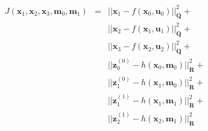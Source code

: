 \documentclass[a4paper,10pt]{article}
\begin{document}
\newline
\newline
\begin{eqnarray}
   J(\textbf{x}_1, \textbf{x}_2, \textbf{x}_3, \textbf{m}_0, \textbf{m}_1) & = & ||\textbf{x}_{1} - f(\textbf{x}_0, \textbf{u}_0)||^2_{\textbf{Q}} +\nonumber \\
                                                                   {} &  & ||\textbf{x}_{2}-f(\textbf{x}_1, \textbf{u}_1) ||^2_{\textbf{Q}} +\nonumber \\
                                                                   {} &  & ||\textbf{x}_{3}-f(\textbf{x}_2, \textbf{u}_2) ||^2_{\textbf{Q}} +\nonumber \\
                                                                   {} &  & || \textbf{z}_0^{(0)} - h(\textbf{x}_0, \textbf{m}_0) ||^2_{\textbf{R}} +\nonumber \\
                                                                   {} &  & || \textbf{z}_1^{(0)} - h(\textbf{x}_1, \textbf{m}_0) ||^2_{\textbf{R}} +\nonumber \\
                                                                   {} &  & || \textbf{z}_1^{(1)} - h(\textbf{x}_1, \textbf{m}_1) ||^2_{\textbf{R}} +\nonumber \\
                                                                   {} &  & || \textbf{z}_2^{(1)} - h(\textbf{x}_2, \textbf{m}_1) ||^2_{\textbf{R}} \nonumber                                                                 
\end{eqnarray}
\newline
\newline
\newline
\newline
\newline
\newline
\newline
\newline
\newline
\newline
\newline
\newline
\newline
\newline
\newline
\newline
\newline
\newline
\newline
\end{document}
